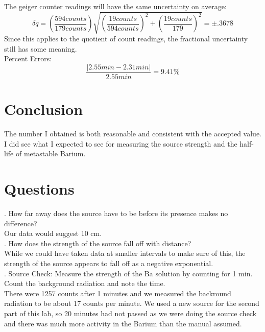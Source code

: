 \documentclass[12pt]{article}
\begin{document}
\indent The geiger counter readings will have the same uncertainty on average:
\[\delta q = (\frac{594 counts}{179 counts})\sqrt{(\frac{19 counts}{594 counts})^2 + (\frac{19 counts}{179})^2 } = \pm .3678 \]
\indent Since this applies to the quotient of count readings, the fractional uncertainty still has some meaning. \\

\indent Percent Errors:
\[\frac{|2.55 min - 2.31 min|}{2.55 min} = 9.41 \% \]

\section{Conclusion}
\indent \indent The number I obtained is both reasonable and consistent with the accepted value. I did see what I expected to see for measuring the source strength and the half-life of metastable Barium.

\section{Questions}
\indent {}. How far away does the source have to be before its presence makes no difference? \\
\indent Our data would suggest 10 cm. \\
. How does the strength of the source fall off with distance? \\
\indent While we could have taken data at smaller intervals to make sure of this, the strength of the source appears to fall off as a negative exponential. \\
. Source Check: Measure the strength of the Ba solution by counting for 1 min. Count the background radiation and note the time. \\
\indent There were 1257 counts after 1 minutes and we measured the backround radiation to be about 17 counts per minute. We used a new source for the second part of this lab, so 20 minutes had not passed as we were doing the source check and there was much more activity in the Barium than the manual assumed.
\end{document}
